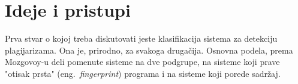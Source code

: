 \documentclass[a4paper]{article}
\begin{document}
\section{Ideje i pristupi}
\label{sec:ideje i pristupi}

Prva stvar o kojoj treba diskutovati jeste klasifikacija sistema za detekciju plagijarizama. Ona je, prirodno, za svakoga drugačija. Osnovna podela, prema Mozgovoy-u \cite{mozgovoy} deli pomenute sisteme na dve podgrupe, na sisteme koji prave "otisak prsta" (eng.~{\em fingerprint}) programa i na sisteme koji porede sadržaj.

\end{document}
